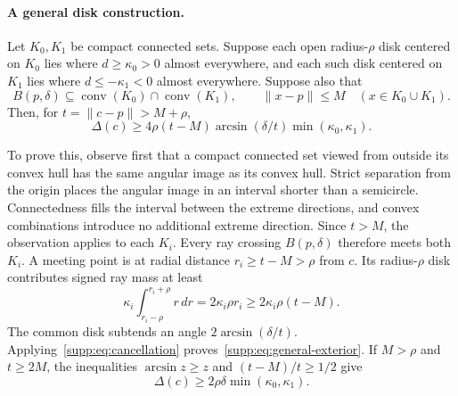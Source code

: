 \paragraph{A general disk construction.}
Let $K_0,K_1$ be compact connected sets. Suppose each open radius-$\rho$ disk centered on $K_0$ lies where $d\geq\kappa_0>0$ almost everywhere, and each such disk centered on $K_1$ lies where $d\leq-\kappa_1<0$ almost everywhere. Suppose also that
\[
 B(p,\delta)\subseteq\operatorname{conv}(K_0)\cap\operatorname{conv}(K_1),
 \qquad \|x-p\|\leq M\quad(x\in K_0\cup K_1).
\]
Then, for $t=\|c-p\|>M+\rho$,
\begin{equation}
 \Delta(c)\geq4\rho(t-M)\arcsin(\delta/t)
                   \min(\kappa_0,\kappa_1).
 \label{supp:eq:general-exterior}
\end{equation}

To prove this, observe first that a compact connected set viewed from outside its convex hull has the same angular image as its convex hull. Strict separation from the origin places the angular image in an interval shorter than a semicircle. Connectedness fills the interval between the extreme directions, and convex combinations introduce no additional extreme direction. Since $t>M$, the observation applies to each $K_i$. Every ray crossing $B(p,\delta)$ therefore meets both $K_i$. A meeting point is at radial distance $r_i\geq t-M>\rho$ from $c$. Its radius-$\rho$ disk contributes signed ray mass at least
\[
 \kappa_i\int_{r_i-\rho}^{r_i+\rho}r\,dr
 =2\kappa_i\rho r_i\geq2\kappa_i\rho(t-M).
\]
The common disk subtends an angle $2\arcsin(\delta/t)$. Applying~\eqref{supp:eq:cancellation} proves~\eqref{supp:eq:general-exterior}. If $M>\rho$ and $t\geq2M$, the inequalities $\arcsin z\geq z$ and $(t-M)/t\geq1/2$ give
\begin{equation}
 \Delta(c)\geq2\rho\delta\min(\kappa_0,\kappa_1).
 \label{supp:eq:constant-exterior}
\end{equation}


